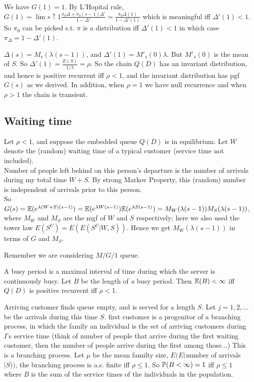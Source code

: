 \documentclass[a4paper]{article}
\begin{document}
We have $G(1) = 1$. By L'Hopital rule, $G(1) = \lim{s \uparrow 1} \frac{\pi_0 \Delta + \pi_0(s-1)\Delta'}{1-\Delta'} = \frac{\pi_0 \Delta(1)}{1-\Delta'(1)}$ which is meaningful iff $\Delta'(1) < 1$. So $\pi_0$ can be picked s.t. $\pi$ is a distribution iff $\Delta'(1) < 1$ in which case $\pi_\Delta = 1-\Delta'(1)$.

$\Delta(s) = M_s(\lambda(s-1))$, and $\Delta'(1) = M'_s(0) \lambda$. But $M'_s(0)$ is the mean of $S$. So $\Delta'(1) = \frac{E(S)}{1/\lambda} = \rho$. So the chain $Q(D)$ has an invariant distribution, and hence is positive recurrent iff $\rho<1$, and the invariant distribution has pgf $G(s)$ as we derived. In addition, when $\rho=1$ we have null recurrence and when $\rho>1$ the chain is transient.

\subsection{Waiting time}
Let $\rho < 1$, and suppose the embedded queue $Q(D)$ is in equilibrium. Let $W$ denote the (random) waiting time of a typical customer (service time not included).\\
Number of people left behind on this person's departure is the number of arrivals during my total time $W+S$. By strong Markov Property, this (random) number is independent of arrivals prior to this person.\\
So $G(s) = \E(e^{\lambda (W+S) (s-1)}) = \E(e^{\lambda W(s-1)}) \E(e^{\lambda S(s-1)}) = M_W(\lambda(s-1))M_S(\lambda(s-1))$, where $M_W$ and $M_S$ are the mgf of $W$ and $S$ respectively; here we also used the tower law $E(S^U) = E(E(S^U|W,S))$. Hence we get $M_W(\lambda(s-1))$ in terms of $G$ and $M_S$.

Remember we are considering $M/G/1$ queue. 

A busy period is a maximal interval of time during which the server is continuously busy. Let $B$ be the length of \emph{a} busy period. Then $\E(B) < \infty$ iff $Q(D)$ is positive recurrent iff $\rho<1$.

Arriving customer finds queue empty, and is served for a length $S$. Let $j=1,2,...$ be the arrivals during this time $S$. first customer is a progenitor of a branching process, in which the family an individual is the set of arriving customers during $I$'s service time (think of number of people that arrive during the first waiting customer, then the number of people arrive during the first among those...) This is a branching process. Let $\mu$ be the mean familty size, $E(E($number of arrivals$|S))$, the branching process is a.s. finite iff $\rho \leq 1$. So $\P(B<\infty) = 1$ iff $\rho \leq 1$ where $B$ is the sum of the service times of the individuals in the population.
\end{document}
